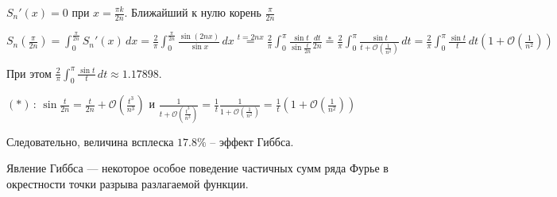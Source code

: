 \begin{example}
\begin{enumerate}
{            %

            $S_n' (x) = 0$ при $x = \frac{\pi k}{2n}$. Ближайший к нулю корень $\frac{\pi}{2n}$

            $S_n (\frac{\pi}{2n}) = \int_0^{\frac{\pi}{2n}} S_n'(x) \, dx = \frac{2}{\pi} \int_0^{\frac{\pi}{2n}} \frac{\sin (2 n x)}{\sin x} \, dx \overset{t = 2nx}{=} \frac{2}{\pi} \int_0^{\pi} \frac{\sin t}{\sin \frac{t}{2n}} \frac{dt}{2n}
            \overset{*}{=} \frac{2}{\pi} \int_0^\pi \frac{\sin t}{t + \mathcal{O}(\frac{1}{n^2})} \, dt = \frac{2}{\pi} \int_0^\pi \frac{\sin t}{t} \, dt (1 + \mathcal{O} (\frac{1}{n^2}))$

            При этом $\frac{2}{\pi} \int_0^\pi \frac{\sin t}{t} \, dt \approx 1.17898$.

            $(*) \, : \, \sin \frac{t}{2n} = \frac{t}{2n} + \mathcal{O}(\frac{t^3}{n^3})$ и $\frac{1}{t + \mathcal{O} (\frac{t^3}{n^3})} = \frac{1}{t} \frac{1}{1 + \mathcal{O} (\frac{1}{n^2})} = \frac{1}{t} (1 + \mathcal{O} (\frac{1}{n^2}))$

            Следовательно, величина всплеска $17.8\%$ -- эффект Гиббса.

            Явление Гиббса — некоторое особое поведение частичных сумм ряда Фурье в окрестности точки разрыва разлагаемой функции.
        }
    \end{enumerate}
\end{example}

